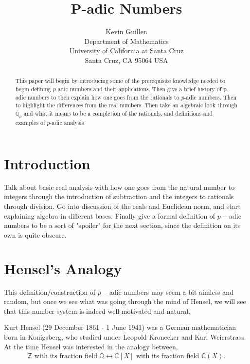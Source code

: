 \documentclass[12pt]{article}
\newcommand{\zz}{\mathbb Z}   %
\newcommand{\qq}{\mathbb Q}   %
\newcommand{\cc}{\mathbb C}   %
\begin{document}
\title{P-adic Numbers}

\author{Kevin Guillen \\ 
Department of Mathematics \\
University of California at Santa Cruz \\
Santa Cruz, CA 95064 USA}

\maketitle

\begin{abstract}
This paper will begin by introducing some of the prerequisite knowledge needed to begin defining $p$-adic numbers and their applications. Then give a brief history of p-adic numbers to then explain how one goes from the rationals to $p$-adic numbers. Then to highlight the differences from the real numbers. Then take an algebraic look through $\qq_p$ and what it means to be a completion of the rationals, and definitions and examples of  $p$-adic analysis
\end{abstract}

\section{Introduction}
Talk about basic real analysis with how one goes from the natural number to integers through the introduction of subtraction and the integers to rationals through division. Go into discussion of the reals and Euclidean norm, and start explaining algebra in different bases. Finally give a formal definition of $p-$adic numbers to be a sort of "spoiler" for the next section, since the definition on its own is quite obscure. 

\section{Hensel's Analogy}
This definition/construction of $p-$adic numbers may seem a bit aimless and random, but once we see what was going through the mind of Hensel, we will see that this number system is indeed well motivated and natural. 

Kurt Hensel (29 December 1861 - 1 June 1941) was a German mathematician born in Konigsberg, who studied under Leopold Kronecker and Karl Weierstrass. At the time Hensel was interested in the analogy between,
\begin{align*}
  \zz \text{ with its fraction field } \qq \longleftrightarrow \cc[X] \text{ with its fraction field }\cc(X).
\end{align*}
\end{document}
